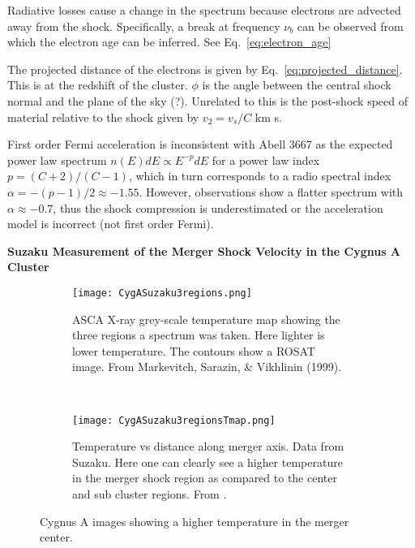 \documentclass[MScProj_TLRH_ClusterEnergy.tex]{subfiles}
\begin{document}
Radiative losses cause a change in the spectrum because electrons are advected away from the shock. Specifically, a break at frequency $\nu_b$ can be observed from which the electron age can be inferred. See Eq.~\ref{eq:electron_age}

The projected distance of the electrons is given by Eq.~\ref{eq:projected_distance}. This is at the redshift of the cluster. $\phi$ is the angle between the central shock normal and the plane of the sky (?). Unrelated to this is the post-shock speed of material relative to the shock given by $v_2 = v_s/C$ km s.

First order Fermi acceleration is inconsistent with Abell 3667 as the expected power law spectrum $n(E) dE \propto E^{-p} dE$ for a power law index $p=(C+2)/(C-1)$, which in turn corresponds to a radio spectral index $\alpha = -(p-1)/2 \approx -1.55$. However, observations show a flatter spectrum with $\alpha \approx -0.7$, thus the shock compression is underestimated or the acceleration model is incorrect (not first order Fermi).

\textbf{Suzaku Measurement of the Merger Shock Velocity in the Cygnus A Cluster}
\begin{figure}
    \centering
    \begin{subfigure}[b]{0.4\textwidth}
        \texttt{[image: CygASuzaku3regions.png]}
        \caption{ASCA X-ray grey-scale temperature map showing the three regions a spectrum was taken. Here lighter is lower temperature. The contours show a ROSAT image. From Markevitch, Sarazin, \& Vikhlinin (1999).}
        \label{fig:CygA_ASCA_3regions}
    \end{subfigure}
    ~ %
    \begin{subfigure}[b]{0.4\textwidth}
        \texttt{[image: CygASuzaku3regionsTmap.png]}
        \caption{Temperature vs distance along merger axis. Data from Suzaku. Here one can clearly see a higher temperature in the merger shock region as compared to the center and sub cluster regions. From \citet{2013AN....334..346S}.}
        \label{fig:CygA_Suzaku}
    \end{subfigure}
    \caption{Cygnus A images showing a higher temperature in the merger center.}\label{fig:CygA_SarazinFinoguenovWik2012}
\end{figure}
\end{document}
